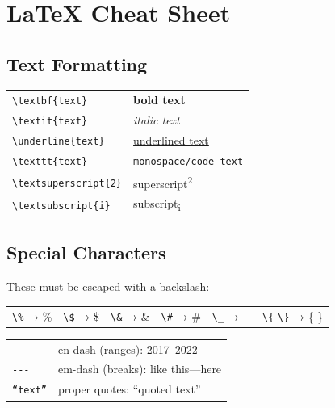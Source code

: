 \documentclass[../main.tex]{subfiles}
\begin{document}
\section*{LaTeX Cheat Sheet}

\subsection*{Text Formatting}
\begin{tabular}{ll}
\texttt{\textbackslash textbf\{text\}} & \textbf{bold text} \\
\texttt{\textbackslash textit\{text\}} & \textit{italic text} \\
\texttt{\textbackslash underline\{text\}} & \underline{underlined text} \\
\texttt{\textbackslash texttt\{text\}} & \texttt{monospace/code text} \\
\texttt{\textbackslash textsuperscript\{2\}} & superscript\textsuperscript{2} \\
\texttt{\textbackslash textsubscript\{i\}} & subscript\textsubscript{i} \\
\end{tabular}

\vspace{1em}

\subsection*{Special Characters}
These must be escaped with a backslash:

\begin{tabular}{llllll}
\texttt{\textbackslash\%} → \% &
\texttt{\textbackslash\$} → \$ &
\texttt{\textbackslash\&} → \& &
\texttt{\textbackslash\#} → \# &
\texttt{\textbackslash\_} → \_ &
\texttt{\textbackslash\{} \texttt{\textbackslash\}} → \{ \} \\
\end{tabular}

\vspace{0.5em}

\begin{tabular}{ll}
\texttt{-{}-} & en-dash (ranges): 2017--2022 \\
\texttt{-{}-{}-} & em-dash (breaks): like this---here \\
\texttt{``text''} & proper quotes: ``quoted text'' \\
\end{tabular}
\end{document}
